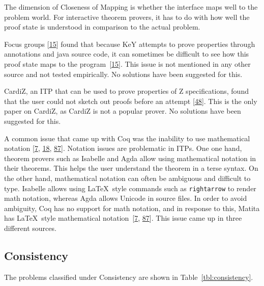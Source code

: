 \documentclass[
]{article}
\newcommand{\passthrough}[1]{#1}
\begin{document}
The dimension of Closeness of Mapping is whether the interface maps well
to the problem world. For interactive theorem provers, it has to do with
how well the proof state is understood in comparison to the actual
problem.

Focus groups {[}\protect\hyperlink{ref-beckert_usability_2015}{15}{]}
found that because KeY attempts to prove properties through annotations
and java source code, it can sometimes be difficult to see how this
proof state maps to the
program~{[}\protect\hyperlink{ref-beckert_usability_2015}{15}{]}. This
issue is not mentioned in any other source and not tested empirically.
No solutions have been suggested for this.

CardiZ, an ITP that can be used to prove properties of Z specifications,
found that the user could not sketch out proofs before an attempt
{[}\protect\hyperlink{ref-kadoda_cognitive_2000}{48}{]}. This is the
only paper on CardiZ, as CardiZ is not a popular prover. No solutions
have been suggested for this.

A common issue that came up with Coq was the inability to use
mathematical notation {[}\protect\hyperlink{ref-asperti_user_2007}{7},
\protect\hyperlink{ref-berman_development_2014}{18},
\protect\hyperlink{ref-zacchiroli_user_2007}{87}{]}. Notation issues are
problematic in ITPs. One one hand, theorem provers such as Isabelle and
Agda allow using mathematical notation in their theorems. This helps the
user understand the theorem in a terse syntax. On the other hand,
mathematical notation can often be ambiguous and difficult to type.
Isabelle allows using LaTeX~style commands such as
\passthrough{\lstinline!rightarrow!} to render math notation, whereas
Agda allows Unicode in source files. In order to avoid ambiguity, Coq
has no support for math notation, and in response to this, Matita has
LaTeX~style mathematical
notation~{[}\protect\hyperlink{ref-asperti_user_2007}{7},
\protect\hyperlink{ref-zacchiroli_user_2007}{87}{]}. This issue came up
in three different sources.

\hypertarget{consistency}{%
\subsection{Consistency}\label{consistency}}

The problems classified under Consistency are shown in
Table~\ref{tbl:consistency}.
\end{document}
